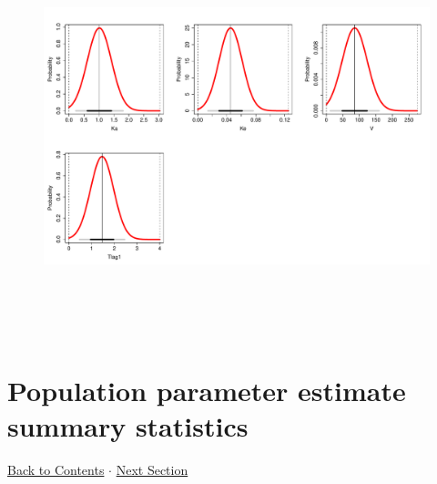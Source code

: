 \documentclass{article}
\begin{document}
\begin{figure}[H] 
          \includegraphics[height=4.5in,width=8in]{final.pdf}
          \end{figure} 
              
          \hypertarget{ppe}{}
          
          \section{Population parameter estimate summary statistics} 
 \hyperlink{tableofcontents}{Back to Contents} $\cdot$ \hyperlink{covforppe}{Next Section} \newline
          \newline 
\end{document}
